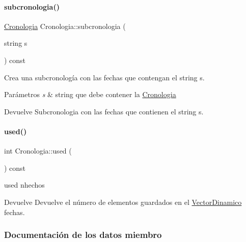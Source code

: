 \paragraph{\texorpdfstring{subcronologia()}{subcronologia()}\hspace{0.1cm}{\footnotesize\ttfamily [2/2]}}
{\footnotesize\ttfamily \hyperlink{classCronologia}{Cronologia} Cronologia\+::subcronologia (\begin{DoxyParamCaption}\item[{string}]{s }\end{DoxyParamCaption}) const}



Crea una subcronología con las fechas que contengan el string s. 


\begin{DoxyParams}{Parámetros}
{\em s} & string que debe contener la {\ttfamily \hyperlink{classCronologia}{Cronologia}} \\
\hline
\end{DoxyParams}
\begin{DoxyReturn}{Devuelve}
Subcronologia con las fechas que contienen el string s. 
\end{DoxyReturn}
\mbox{\label{classCronologia_a36024f9da51673ebcb5d3df90fdbf6ae}} 
\paragraph{\texorpdfstring{used()}{used()}}
{\footnotesize\ttfamily int Cronologia\+::used (\begin{DoxyParamCaption}{ }\end{DoxyParamCaption}) const}



used nhechos 

\begin{DoxyReturn}{Devuelve}
Devuelve el número de elementos guardados en el {\ttfamily \hyperlink{classVectorDinamico}{Vector\+Dinamico}} {\ttfamily fechas}. 
\end{DoxyReturn}


\subsubsection{Documentación de los datos miembro}
\mbox{\label{classCronologia_a22756c56c89a59928e5d0f84948aa58a}} 
